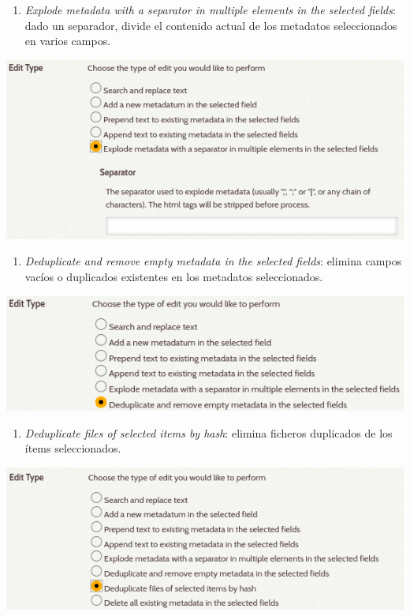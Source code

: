\documentclass[
]{article}
\providecommand{\tightlist}{%
  \setlength{\itemsep}{0pt}\setlength{\parskip}{0pt}}
\begin{document}
\begin{enumerate}
  \begin{enumerate}
  \def\labelenumii{\alph{enumii}.}
  \setcounter{enumii}{4}
  \tightlist
  \item
    \emph{Explode metadata with a separator in multiple elements in the
    selected fields}: dado un separador, divide el contenido actual de
    los metadatos seleccionados en varios campos.
  \end{enumerate}

  \includegraphics{../_static/images/be-3-5.png}

  \begin{enumerate}
  \def\labelenumii{\alph{enumii}.}
  \setcounter{enumii}{5}
  \tightlist
  \item
    \emph{Deduplicate and remove empty metadata in the selected fields}:
    elimina campos vacíos o duplicados existentes en los metadatos
    seleccionados.
  \end{enumerate}

  \includegraphics{../_static/images/be-3-6.png}

  \begin{enumerate}
  \def\labelenumii{\alph{enumii}.}
  \setcounter{enumii}{6}
  \tightlist
  \item
    \emph{Deduplicate files of selected items by hash}: elimina ficheros
    duplicados de los ítems seleccionados.
  \end{enumerate}

  \includegraphics{../_static/images/be-3-7.png}


\end{enumerate}
\end{document}
